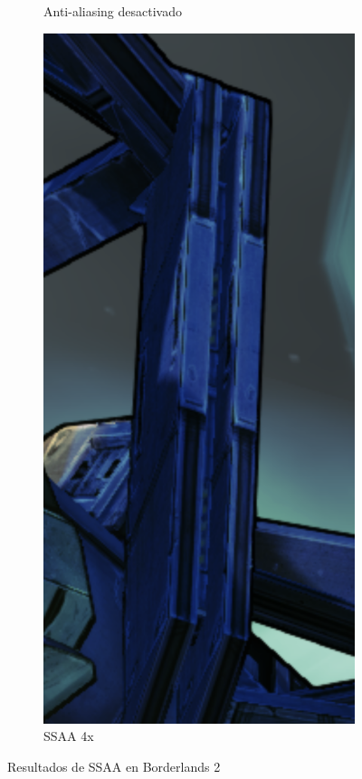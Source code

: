 \documentclass[withindex, glossary]{cam-thesis}
\begin{document}
\begin{figure}[!htbp]
\begin{subfigure}[b]{0.3\textwidth}
        \caption{Anti-aliasing desactivado}
    \end{subfigure}
    \begin{subfigure}[b]{0.3\textwidth}
        \includegraphics[width=\textwidth]{figures/ss2on.png}
        \caption{SSAA 4x}
    \end{subfigure}
    \caption{Resultados de SSAA en Borderlands 2}
    \label{ss2}
\end{figure}
\end{document}
